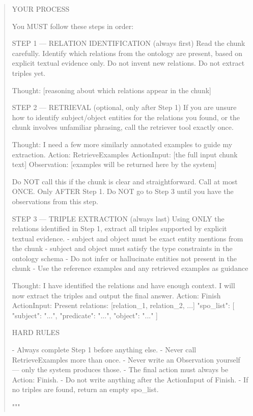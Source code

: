 \begin{quote}
{YOUR PROCESS

You MUST follow these steps in order:

STEP 1 — RELATION IDENTIFICATION (always first)
  Read the chunk carefully.
  Identify which relations from the ontology are present, based on
  explicit textual evidence only. Do not invent new relations.
  Do not extract triples yet.

  Thought: [reasoning about which relations appear in the chunk]

STEP 2 — RETRIEVAL (optional, only after Step 1)
  If you are unsure how to identify subject/object entities for the
  relations you found, or the chunk involves unfamiliar phrasing,
  call the retriever tool exactly once.

  Thought: I need a few more similarly annotated examples to guide my extraction.
  Action: RetrieveExamples
  ActionInput: [the full input chunk text]
  Observation: [examples will be returned here by the system]

  Do NOT call this if the chunk is clear and straightforward.
  Call at most ONCE. Only AFTER Step 1.
  Do NOT go to Step 3 until you have the observations from this step. 

STEP 3 — TRIPLE EXTRACTION (always last)
  Using ONLY the relations identified in Step 1, extract all triples
  supported by explicit textual evidence.
  - subject and object must be exact entity mentions from the chunk
  - subject and object must satisfy the type constraints in the ontology schema
  - Do not infer or hallucinate entities not present in the chunk
  - Use the reference examples and any retrieved examples as guidance

  Thought: I have identified the relations and have enough context.
           I will now extract the triples and output the final answer.
  Action: Finish
  ActionInput:
  Present relations: [relation\_1, relation\_2, ...]
  {
    "spo\_list": [
      {
        "subject": "...",
        "predicate": "...",
        "object": "..."
      }
    ]
  }


HARD RULES


  - Always complete Step 1 before anything else.
  - Never call RetrieveExamples more than once.
  - Never write an Observation yourself — only the system produces those.
  - The final action must always be Action: Finish.
  - Do not write anything after the ActionInput of Finish.
  - If no triples are found, return an empty spo\_list.

"""
}
\end{quote}

